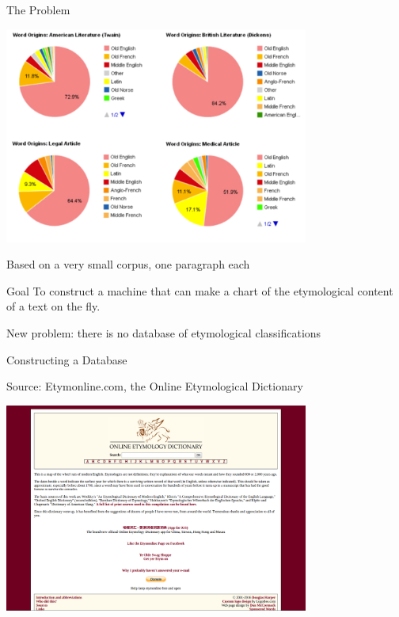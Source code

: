 \documentclass[10pt]{beamer}
\begin{document}
\begin{frame}[fragile]{The Problem}

  \pause
  \centerline{\includegraphics[width=10cm]{blogcharts.png}}

  Based on a very small corpus, one paragraph each


\end{frame}


\begin{frame}[fragile]{Goal}
  \pause
  To construct a machine that can make a chart of the etymological content of a text on the fly.

  \pause

  New problem: there is no database of etymological classifications


\end{frame}

\begin{frame}[fragile]{Constructing a Database}
  \pause

  Source: Etymonline.com, the Online Etymological Dictionary

  \pause
  \centerline{\includegraphics[width=10cm]{etymonlinehomepage.png}}


\end{frame}
\end{document}
